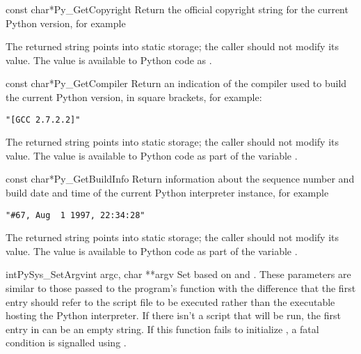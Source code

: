 \begin{cfuncdesc}{const char*}{Py_GetCopyright}{}
  Return the official copyright string for the current Python version,
  for example


  The returned string points into static storage; the caller should
  not modify its value.  The value is available to Python code as
  .
\end{cfuncdesc}

\begin{cfuncdesc}{const char*}{Py_GetCompiler}{}
  Return an indication of the compiler used to build the current
  Python version, in square brackets, for example:

\begin{verbatim}
"[GCC 2.7.2.2]"
\end{verbatim}

  The returned string points into static storage; the caller should
  not modify its value.  The value is available to Python code as part
  of the variable .
\end{cfuncdesc}

\begin{cfuncdesc}{const char*}{Py_GetBuildInfo}{}
  Return information about the sequence number and build date and time 
  of the current Python interpreter instance, for example

\begin{verbatim}
"#67, Aug  1 1997, 22:34:28"
\end{verbatim}

  The returned string points into static storage; the caller should
  not modify its value.  The value is available to Python code as part
  of the variable .
\end{cfuncdesc}

\begin{cfuncdesc}{int}{PySys_SetArgv}{int argc, char **argv}
  Set  based on  and .  These
  parameters are similar to those passed to the program's
   function with the difference that
  the first entry should refer to the script file to be executed
  rather than the executable hosting the Python interpreter.  If there
  isn't a script that will be run, the first entry in  can
  be an empty string.  If this function fails to initialize
  , a fatal condition is signalled using
  .
\end{cfuncdesc}


